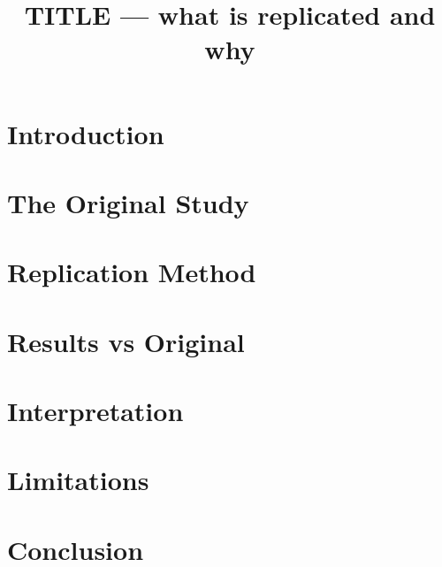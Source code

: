 \documentclass[sigconf,review,anonymous]{acmart}
\begin{document}
\title{TITLE — what is replicated and why}
\begin{abstract}\end{abstract}
\maketitle
\section{Introduction}            %
\section{The Original Study}      %
\section{Replication Method}      %
\section{Results vs Original}
\section{Interpretation}          %
\section{Limitations}
\section{Conclusion}

\end{document}
